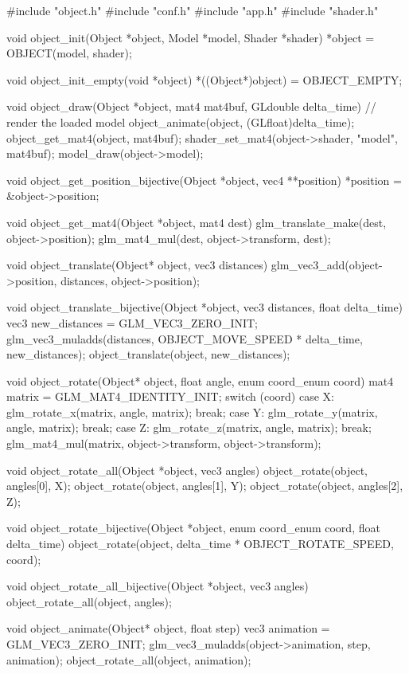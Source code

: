 \begin{multicols}{2}
\begin{ccode}
#include "object.h"
#include "conf.h"
#include "app.h"
#include "shader.h"

void object_init(Object *object, Model *model, Shader *shader) {
    *object = OBJECT(model, shader);
}

void object_init_empty(void *object) {
    *((Object*)object) = OBJECT_EMPTY;
}

void object_draw(Object *object, mat4 mat4buf, GLdouble delta_time) {
    // render the loaded model
    object_animate(object, (GLfloat)delta_time);
    object_get_mat4(object, mat4buf);
    shader_set_mat4(object->shader, "model", mat4buf);
    model_draw(object->model);
}

void object_get_position_bijective(Object *object, vec4 **position) {
    *position = &object->position;
}

void object_get_mat4(Object *object, mat4 dest) {
    glm_translate_make(dest, object->position);
    glm_mat4_mul(dest, object->transform, dest);
}

void object_translate(Object* object, vec3 distances) {
    glm_vec3_add(object->position, distances, object->position);
}

void object_translate_bijective(Object *object, vec3 distances, float delta_time) {
    vec3 new_distances = GLM_VEC3_ZERO_INIT;
    glm_vec3_muladds(distances, OBJECT_MOVE_SPEED * delta_time,
                     new_distances);
    object_translate(object, new_distances);
}

void object_rotate(Object* object, float angle, enum coord_enum coord) {
    mat4 matrix = GLM_MAT4_IDENTITY_INIT;
    switch (coord) {
    case X: glm_rotate_x(matrix, angle, matrix); break;
    case Y: glm_rotate_y(matrix, angle, matrix); break;
    case Z: glm_rotate_z(matrix, angle, matrix); break;
    }
    glm_mat4_mul(matrix, object->transform, object->transform);
}

void object_rotate_all(Object *object, vec3 angles) {
    object_rotate(object, angles[0], X);
    object_rotate(object, angles[1], Y);
    object_rotate(object, angles[2], Z);
}

void object_rotate_bijective(Object *object, enum coord_enum coord,
                             float delta_time) {
    object_rotate(object, delta_time * OBJECT_ROTATE_SPEED, coord);
}

void object_rotate_all_bijective(Object *object, vec3 angles) {
    object_rotate_all(object, angles);
}

void object_animate(Object* object, float step) {
    vec3 animation = GLM_VEC3_ZERO_INIT;
    glm_vec3_muladds(object->animation, step, animation);
    object_rotate_all(object, animation);
}


\end{ccode}
\end{multicols}
